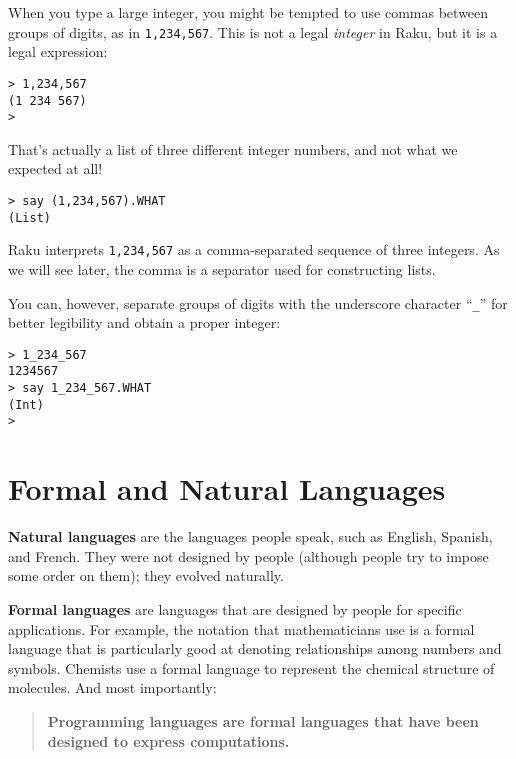 When you type a large integer, you might be tempted to use commas
between groups of digits, as in {\tt 1,234,567}.  This is not a
legal {\em integer} in Raku, but it is a legal expression:

\begin{verbatim}
> 1,234,567
(1 234 567)
>
\end{verbatim}
%
That's actually a list of three different integer numbers, and 
not what we expected at all! 

\begin{verbatim}
> say (1,234,567).WHAT
(List)
\end{verbatim}

Raku interprets {\tt 1,234,567} as a comma-separated 
sequence of three integers.  As we will see later, 
the comma is a separator used for constructing lists.

You can, however, separate groups of digits with the underscore character ``\verb"_"'' for better legibility and obtain a 
proper integer:

\begin{verbatim}
> 1_234_567
1234567
> say 1_234_567.WHAT
(Int)
>
\end{verbatim}
%




\section{Formal and Natural Languages}

{\bf Natural languages} are the languages people speak,
such as English, Spanish, and French.  They were not designed
by people (although people try to impose some order on them);
they evolved naturally.

{\bf Formal languages} are languages that are designed by people for
specific applications.  For example, the notation that mathematicians
use is a formal language that is particularly good at denoting
relationships among numbers and symbols.  Chemists use a formal
language to represent the chemical structure of molecules.  And
most importantly:

\begin{quote}
{\bf Programming languages are formal languages that have been
designed to express computations.}
\end{quote}

